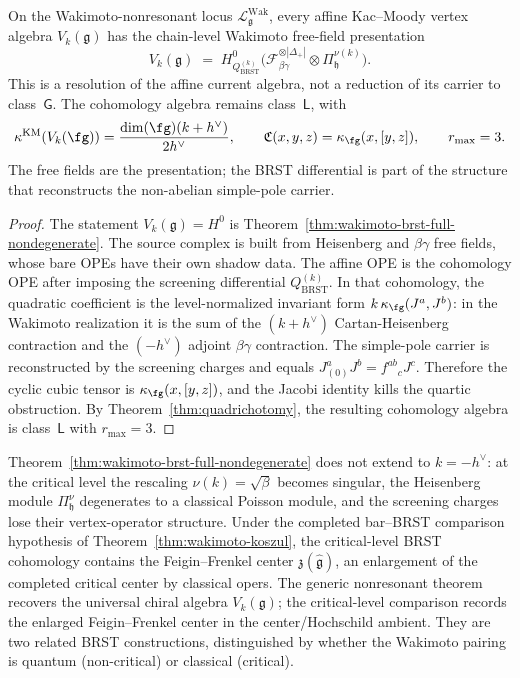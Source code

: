\begin{corollary}
\label{cor:class-L-reduces-to-G-chain-level}
\ClaimStatusConditional
{}
On the Wakimoto-nonresonant locus
$\mathcal{L}^{\mathrm{Wak}}_{\mathfrak{g}}$, every affine Kac--Moody
vertex algebra \(V_k(\mathfrak g)\) has the chain-level
Wakimoto free-field presentation
\[
V_k(\mathfrak{g})
\;=\;
H^0_{Q_{\mathrm{BRST}}^{(k)}}
\bigl(\mathcal{F}_{\beta\gamma}^{\otimes|\Delta_+|}
\otimes \Pi^{\nu(k)}_{\mathfrak{h}}\bigr).
\]
This is a resolution of the affine current algebra, not a reduction
of its carrier to class~\(\mathsf G\). The cohomology algebra remains
class~\(\mathsf L\), with
\[
\kappa^{\mathrm{KM}}(V_k(\fg))
=\frac{\dim(\fg)(k+h^\vee)}{2h^\vee},
\qquad
\mathfrak C(x,y,z)=\kappa_{\fg}(x,[y,z]),
\qquad
r_{\max}=3 .
\]
The free fields are the presentation; the BRST differential is part of
the structure that reconstructs the non-abelian simple-pole carrier.
\end{corollary}

\begin{proof}
The statement $V_k(\mathfrak{g}) = H^0$ is
Theorem~\ref{thm:wakimoto-brst-full-nondegenerate}. The source
complex is built from Heisenberg and \(\beta\gamma\) free fields, whose
bare OPEs have their own shadow data.  The affine OPE is the
cohomology OPE after imposing the screening differential
\(Q_{\mathrm{BRST}}^{(k)}\). In that cohomology, the quadratic
coefficient is the level-normalized invariant form
\(k\,\kappa_{\fg}(J^a,J^b)\): in the Wakimoto realization it is the
sum of the \((k+h^\vee)\) Cartan-Heisenberg contraction and the
\((-h^\vee)\) adjoint \(\beta\gamma\) contraction. The simple-pole
carrier is reconstructed by the screening charges and equals
\(J^a_{(0)}J^b=f^{ab}{}_{c}J^c\). Therefore the cyclic cubic tensor is
\(\kappa_{\fg}(x,[y,z])\), and the Jacobi identity kills the quartic
obstruction. By Theorem~\ref{thm:quadrichotomy}, the resulting
cohomology algebra is class~\(\mathsf L\) with \(r_{\max}=3\).
\end{proof}

\begin{remark}
\label{rem:wakimoto-brst-critical-limit}
Theorem~\ref{thm:wakimoto-brst-full-nondegenerate} does not extend
to $k = -h^\vee$: at the critical level the rescaling
$\nu(k) = \sqrt{\beta}$ becomes singular, the Heisenberg module
$\Pi^{\nu}_{\mathfrak{h}}$ degenerates to a classical Poisson
module, and the screening charges lose their vertex-operator
structure. Under the completed bar--BRST comparison hypothesis of
Theorem~\ref{thm:wakimoto-koszul}, the critical-level BRST
cohomology contains the Feigin--Frenkel center
$\mathfrak{z}(\widehat{\mathfrak{g}})$, an enlargement of the
completed critical center by classical opers. The
generic nonresonant theorem recovers the universal chiral algebra
$V_k(\mathfrak{g})$; the critical-level comparison records the
enlarged Feigin--Frenkel center in the center/Hochschild ambient. They
are two related BRST
constructions, distinguished by whether
the Wakimoto pairing is quantum (non-critical) or classical
(critical).
\end{remark}

